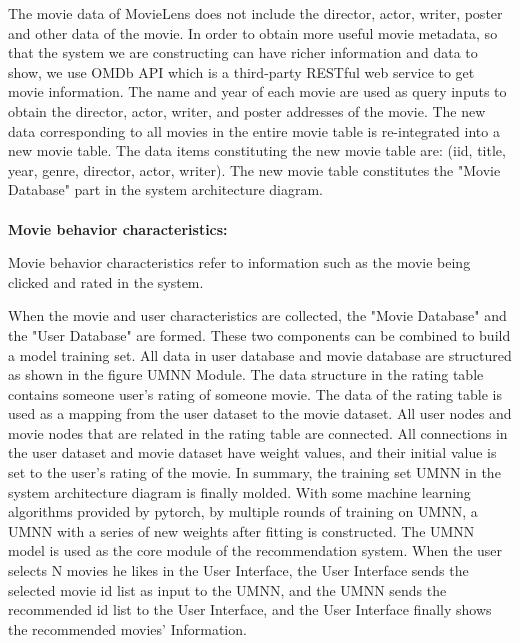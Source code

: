 \par The movie data of MovieLens does not include the director, actor, writer, poster and other data of the movie. In order to obtain more useful movie metadata, so that the system we are constructing can have richer information and data to show, we use OMDb API which is a third-party RESTful web service to get movie information. The name and year of each movie are used as query inputs to obtain the director, actor, writer, and poster addresses of the movie. The new data corresponding to all movies in the entire movie table is re-integrated into a new movie table. The data items constituting the new movie table are: (iid, title, year, genre, director, actor, writer). The new movie table constitutes the "Movie Database" part in the system architecture diagram.
\\
\\
\textbf{Movie behavior characteristics:}
\par Movie behavior characteristics refer to information such as the movie being clicked and rated in the system.
\par When the movie and user characteristics are collected, the "Movie Database" and the "User Database" are formed. These two components can be combined to build a model training set. All data in user database and movie database are structured as shown in the figure UMNN Module. The data structure in the rating table contains someone user's rating of someone movie. The data of the rating table is used as a mapping from the user dataset to the movie dataset. All user nodes and movie nodes that are related in the rating table are connected. All connections in the user dataset and movie dataset have weight values, and their initial value is set to the user's rating of the movie. In summary, the training set UMNN in the system architecture diagram is finally molded. With some machine learning algorithms provided by pytorch, by multiple rounds of training on UMNN, a UMNN with a series of new weights after fitting is constructed. The UMNN model is used as the core module of the recommendation system. When the user selects N movies he likes in the User Interface, the User Interface sends the selected movie id list as input to the UMNN, and the UMNN sends the recommended id list to the User Interface, and the User Interface finally shows the recommended movies' Information.


